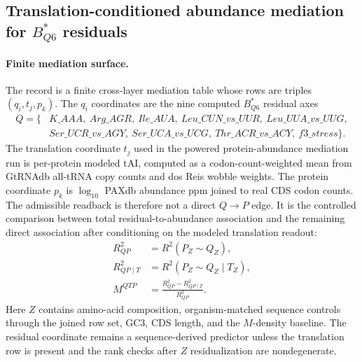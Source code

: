 \subsection{Translation-conditioned abundance mediation for $B^{*}_{Q6}$ residuals}
\label{sec:q6-translation-mediated-protein-abundance-cross-layer}

\paragraph{Finite mediation surface.}
The record is a finite cross-layer mediation table whose rows are triples $(q_i,t_j,p_k)$.  The $q_i$ coordinates are the nine computed $B^{*}_{Q6}$ residual axes
$$
\begin{aligned}
Q=\{&K\_AAA,\ Arg\_AGR,\ Ile\_AUA,\ Leu\_CUN\_vs\_UUR,\ Leu\_UUA\_vs\_UUG,\\
&Ser\_UCR\_vs\_AGY,\ Ser\_UCA\_vs\_UCG,\ Thr\_ACR\_vs\_ACY,\ f3\_stress\}.
\end{aligned}
$$
The translation coordinate $t_j$ used in the powered protein-abundance mediation run is per-protein modeled tAI, computed as a codon-count-weighted mean from GtRNAdb all-tRNA copy counts and dos Reis wobble weights.  The protein coordinate $p_k$ is $\log_{10}$ PAXdb abundance ppm joined to real CDS codon counts.  The admissible readback is therefore not a direct $Q\to P$ edge.  It is the controlled comparison between total residual-to-abundance association and the remaining direct association after conditioning on the modeled translation readout:
$$
\begin{aligned}
R^2_{QP} &= R^2(P_Z\sim Q_Z),\\
R^2_{QP\mid T} &= R^2(P_Z\sim Q_Z\mid T_Z),\\
M^{QTP} &= \frac{R^2_{QP}-R^2_{QP\mid T}}{R^2_{QP}}.
\end{aligned}
$$
Here $Z$ contains amino-acid composition, organism-matched sequence controls through the joined row set, GC3, CDS length, and the $M$-density baseline.  The residual coordinate remains a sequence-derived predictor unless the translation row is present and the rank checks after $Z$ residualization are nondegenerate.


